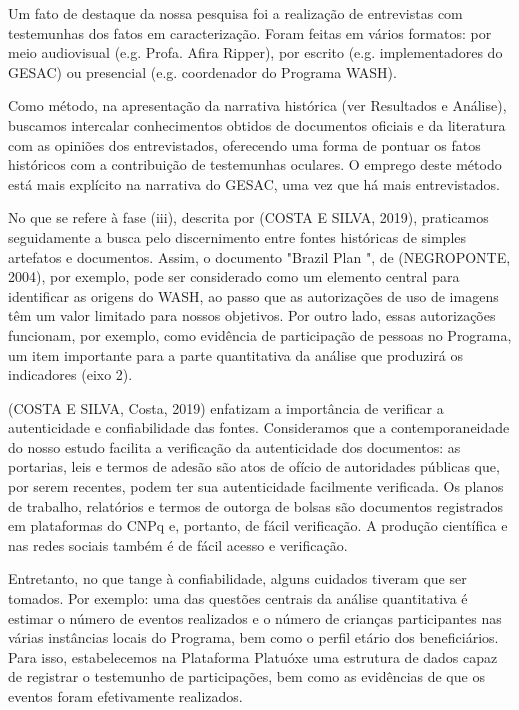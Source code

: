 Um fato de destaque da nossa pesquisa foi a realização de entrevistas com testemunhas dos fatos em caracterização. Foram feitas em vários formatos: por meio audiovisual (e.g. Profa. Afira Ripper), por escrito (e.g. implementadores do GESAC) ou presencial (e.g. coordenador do Programa WASH).

Como método, na apresentação da narrativa histórica (ver Resultados e Análise), buscamos intercalar conhecimentos obtidos de documentos oficiais e da literatura com as opiniões dos entrevistados, oferecendo uma forma de pontuar os fatos históricos com a contribuição de testemunhas oculares. O emprego deste método está mais explícito na narrativa do GESAC, uma vez que há mais entrevistados.

No que se refere à fase (iii), descrita por (COSTA E SILVA, 2019), praticamos seguidamente a busca pelo discernimento entre fontes históricas de simples artefatos e documentos. Assim, o documento "Brazil Plan ", de  (NEGROPONTE, 2004), por exemplo, pode ser considerado como um elemento central para identificar as origens do WASH, ao passo que as autorizações de uso de imagens têm um valor limitado para nossos objetivos.  Por outro lado, essas autorizações funcionam, por exemplo, como evidência de participação de pessoas no Programa, um item importante para a parte quantitativa da análise que produzirá os indicadores (eixo 2).

(COSTA E SILVA, Costa, 2019) enfatizam a importância de verificar a autenticidade e confiabilidade das fontes. Consideramos que a contemporaneidade do nosso estudo facilita a verificação da autenticidade dos documentos: as portarias, leis e termos de adesão são atos de ofício de autoridades públicas que, por serem recentes, podem ter sua autenticidade facilmente verificada. Os planos de trabalho, relatórios e termos de outorga de bolsas são documentos registrados em plataformas do CNPq e, portanto, de fácil verificação. A produção científica e nas redes sociais também é de fácil acesso e verificação.

Entretanto, no que tange à confiabilidade, alguns cuidados tiveram que ser tomados. Por exemplo: uma das questões centrais da análise quantitativa é estimar o número de eventos realizados e o número de crianças participantes nas várias instâncias locais do Programa, bem como o perfil etário dos beneficiários. Para isso, estabelecemos na Plataforma Platuóxe uma estrutura de dados capaz de registrar o testemunho de participações, bem como as evidências de que os eventos foram efetivamente realizados.


